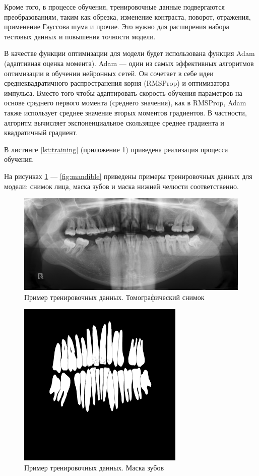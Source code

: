 Кроме того, в процессе обучения, тренировочные данные подвергаются преобразованиям, таким как обрезка, изменение контраста, поворот, отражения, применение Гауссова шума и прочие. Это нужно для расширения набора тестовых данных и повышения точности модели.

В качестве функции оптимизации для модели будет использована функция Adam (адаптивная оценка момента). Adam --- один из самых эффективных алгоритмов оптимизации в обучении нейронных сетей. Он сочетает в себе идеи среднеквадратичного распространения корня (RMSProp) и оптимизатора импульса. Вместо того чтобы адаптировать скорость обучения параметров на основе среднего первого момента (среднего значения), как в RMSProp, Adam также использует среднее значение вторых моментов градиентов. В частности, алгоритм вычисляет экспоненциальное скользящее среднее градиента и квадратичный градиент.

В листинге \ref{lst:training} (приложение 1)  приведена реализация процесса обучения.

На рисунках \ref{fig:scan} --- \ref{fig:mandible} приведены примеры тренировочных данных для модели: снимок лица, маска зубов и маска нижней челюсти соответственно.

\begin{figure}[H]
	\centering
	\includegraphics[width=\textwidth]{img/scan.png}
	\caption{Пример тренировочных данных. Томографический снимок}
	\label{fig:scan}
\end{figure}

\begin{figure}[H]
	\centering
	\includegraphics[width=300px]{img/teeth.png}
	\caption{Пример тренировочных данных. Маска зубов}
	\label{fig:teeth}
\end{figure}

